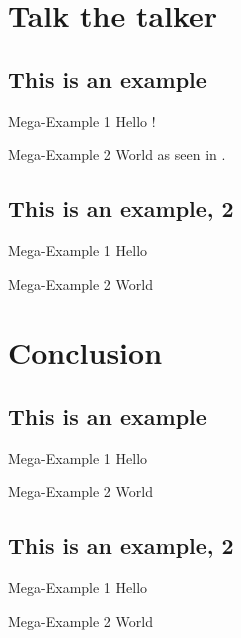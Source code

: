 \documentclass[aspectratio=169,usepdftitle=true,t]{beamer}
\begin{document}
\section{Talk the talker}
\subsection{This is an example}

\begin{frame}{Mega-Example 1}
    Hello \cite{dirac}!
\end{frame}

\begin{frame}{Mega-Example 2}
    World as seen in \cite{einstein}.
\end{frame}

\subsection{This is an example, 2}

\begin{frame}{Mega-Example 1}
    Hello
\end{frame}

\begin{frame}{Mega-Example 2}
    World
\end{frame}


\section{Conclusion}
\subsection{This is an example}

\begin{frame}{Mega-Example 1}
    Hello
\end{frame}

\begin{frame}{Mega-Example 2}
    World
\end{frame}

\subsection{This is an example, 2}

\begin{frame}{Mega-Example 1}
    Hello
\end{frame}

\begin{frame}{Mega-Example 2}
    World
\end{frame}
\end{document}
